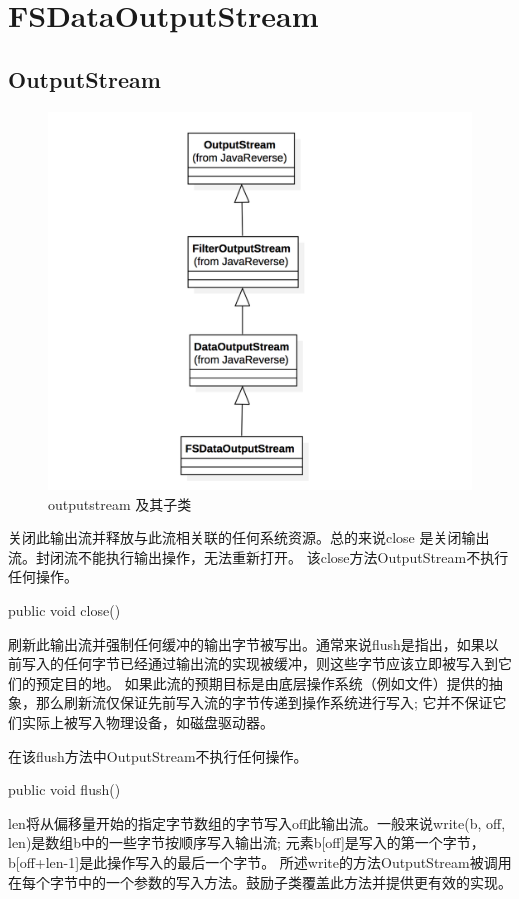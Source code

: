 \section{FSDataOutputStream}
\subsection{OutputStream}

\begin{figure}
\centering
\includegraphics[width =1\linewidth]
{uml/outputstream/11.png}
\caption{outputstream 及其子类}
\label{fig:OutputStream}
\end{figure}




关闭此输出流并释放与此流相关联的任何系统资源。总的来说close 是关闭输出流。封闭流不能执行输出操作，无法重新打开。
该close方法OutputStream不执行任何操作。
\begin{java}
public void close()
\end{java}
刷新此输出流并强制任何缓冲的输出字节被写出。通常来说flush是指出，如果以前写入的任何字节已经通过输出流的实现被缓冲，则这些字节应该立即被写入到它们的预定目的地。
如果此流的预期目标是由底层操作系统（例如文件）提供的抽象，那么刷新流仅保证先前写入流的字节传递到操作系统进行写入; 它并不保证它们实际上被写入物理设备，如磁盘驱动器。

在该flush方法中OutputStream不执行任何操作。
\begin{java}
public void flush()
\end{java}
len将从偏移量开始的指定字节数组的字节写入off此输出流。一般来说write(b, off, len)是数组b中的一些字节按顺序写入输出流; 元素b[off]是写入的第一个字节，b[off+len-1]是此操作写入的最后一个字节。
所述write的方法OutputStream被调用在每个字节中的一个参数的写入方法。鼓励子类覆盖此方法并提供更有效的实现。

